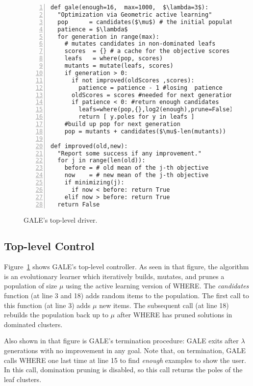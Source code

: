 \documentclass[10pt,journal,compsoc]{IEEEtran}
\newcommand{\fig}[1]{Figure~\ref{fig:#1}}
\begin{document}
\begin{figure}[!t]
\begin{lstlisting}[mathescape,frame=l,numbers=left]
def gale(enough=16,  max=1000,  $\lambda=3$):
  "Optimization via Geometric active learning"
  pop      = candidates($\mu$) # the initial population
  patience = $\lambda$
  for generation in range(max):
    # mutates candidates in non-dominated leafs
    scores  = {} # a cache for the objective scores 
    leafs   = where(pop, scores)
    mutants = mutate(leafs, scores)
    if generation > 0:  
      if not improved(oldScores ,scores):
        patience = patience - 1 #losing  patience
      oldScores = scores #needed for next generation
      if patience < 0: #return enough candidates
        leafs=where(pop,{},log2(enough),prune=False)
        return [ y.poles for y in leafs ] 
    #build up pop for next generation
    pop = mutants + candidates($\mu$-len(mutants))   

def improved(old,new):
  "Report some success if any improvement."
  for j in range(len(old)):
    before = # old mean of the j-th objective
    now    = # new mean of the j-th objective
    if minimizing(j):
      if now < before: return True
    elif now > before: return True
  return False 
\end{lstlisting}

\caption{GALE's top-level driver.}
\label{fig:galeCode}   
\end{figure}




\subsection{Top-level Control}

\fig{galeCode} shows GALE's top-level controller.  As seen in that figure, 
the algorithm  is an
evolutionary learner which iteratively builds,
mutates, and prunes a population of size $\mu$
using the active
learning version of WHERE.
The {\em candidates} function (at line 3 and 18) adds random items to the 
population. The first call to this function (at line 3)
adds $\mu$ new items. The subsequent call (at line 18) rebuilds the population back up to $\mu$ after
WHERE has pruned solutions in dominated clusters.

Also shown in that figure is GALE's termination
procedure: GALE exits after $\lambda$ generations with no improvement
in any goal.
Note that, on termination, GALE calls WHERE one last
time at line 15 to find {\em enough} examples to
show the user. In this call, domination pruning is
disabled, so this call returns the poles of the
leaf clusters.
\end{document}
